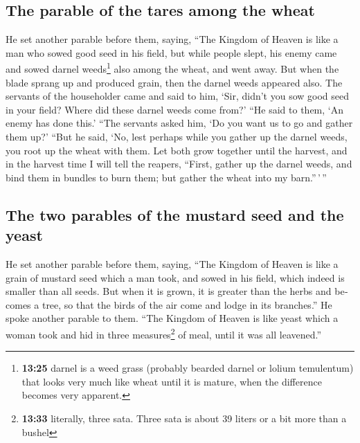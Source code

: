 \begin{paracol}{2}
\begin{otherlanguage}{english}
\hypertarget{the-parable-of-the-tares-among-the-wheat}{%
\subsection{The parable of the tares among the
wheat}\label{the-parable-of-the-tares-among-the-wheat}}

 He set another parable before them, saying, ``The
Kingdom of Heaven is like a man who sowed good seed in his field,
 but while people slept, his enemy came and sowed darnel
weeds\footnote{\textbf{13:25} darnel is a weed grass (probably bearded
  darnel or lolium temulentum) that looks very much like wheat until it
  is mature, when the difference becomes very apparent.} also among the
wheat, and went away.  But when the blade sprang up and
produced grain, then the darnel weeds appeared also.  The
servants of the householder came and said to him, `Sir, didn't you sow
good seed in your field? Where did these darnel weeds come from?'
 ``He said to them, `An enemy has done this.' ``The
servants asked him, `Do you want us to go and gather them up?'
 ``But he said, `No, lest perhaps while you gather up the
darnel weeds, you root up the wheat with them.  Let both
grow together until the harvest, and in the harvest time I will tell the
reapers, ``First, gather up the darnel weeds, and bind them in bundles
to burn them; but gather the wheat into my barn.''\,'\,''

\hypertarget{the-two-parables-of-the-mustard-seed-and-the-yeast}{%
\subsection{The two parables of the mustard seed and the
yeast}\label{the-two-parables-of-the-mustard-seed-and-the-yeast}}

 He set another parable before them, saying, ``The
Kingdom of Heaven is like a grain of mustard seed which a man took, and
sowed in his field,  which indeed is smaller than all
seeds. But when it is grown, it is greater than the herbs and becomes a
tree, so that the birds of the air come and lodge in its branches.''
 He spoke another parable to them. ``The Kingdom of
Heaven is like yeast which a woman took and hid in three
measures\footnote{\textbf{13:33} literally, three sata. Three sata is
  about 39 liters or a bit more than a bushel} of meal, until it was all
leavened.''


\end{otherlanguage}
\end{paracol}
